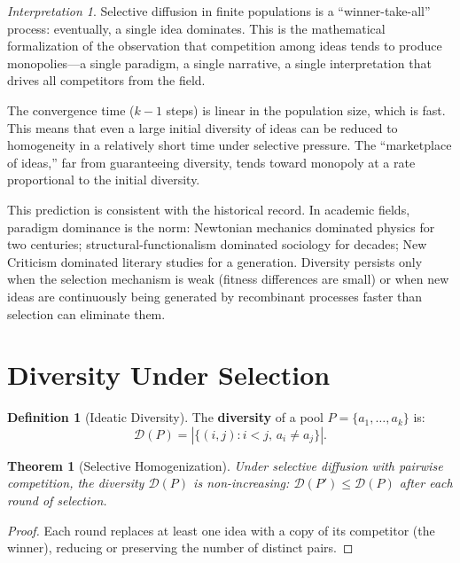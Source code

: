 \documentclass[11pt,openany]{book}
\theoremstyle{definition}
\newtheorem{definition}[axiom]{Definition}
\theoremstyle{plain}
\newtheorem{theorem}[axiom]{Theorem}
\theoremstyle{remark}
\newtheorem{interpretation}[axiom]{Interpretation}
\begin{document}
\begin{interpretation}
Selective diffusion in finite populations is a ``winner-take-all'' process: eventually, a single idea dominates. This is the mathematical formalization of the observation that competition among ideas tends to produce monopolies---a single paradigm, a single narrative, a single interpretation that drives all competitors from the field.

The convergence time ($k - 1$ steps) is linear in the population size, which is fast. This means that even a large initial diversity of ideas can be reduced to homogeneity in a relatively short time under selective pressure. The ``marketplace of ideas,'' far from guaranteeing diversity, tends toward monopoly at a rate proportional to the initial diversity.

This prediction is consistent with the historical record. In academic fields, paradigm dominance is the norm: Newtonian mechanics dominated physics for two centuries; structural-functionalism dominated sociology for decades; New Criticism dominated literary studies for a generation. Diversity persists only when the selection mechanism is weak (fitness differences are small) or when new ideas are continuously being generated by recombinant processes faster than selection can eliminate them.
\end{interpretation}

\section{Diversity Under Selection}

\begin{definition}[Ideatic Diversity]
The \textbf{diversity} of a pool $P = \{a_1, \ldots, a_k\}$ is:
\[
\mathcal{D}(P) = |\{(i, j) : i < j, \, a_i \neq a_j\}|.
\]
\end{definition}

\begin{theorem}[Selective Homogenization]
Under selective diffusion with pairwise competition, the diversity $\mathcal{D}(P)$ is non-increasing: $\mathcal{D}(P') \leq \mathcal{D}(P)$ after each round of selection.
\end{theorem}

\begin{proof}
Each round replaces at least one idea with a copy of its competitor (the winner), reducing or preserving the number of distinct pairs.
\end{proof}
\end{document}
